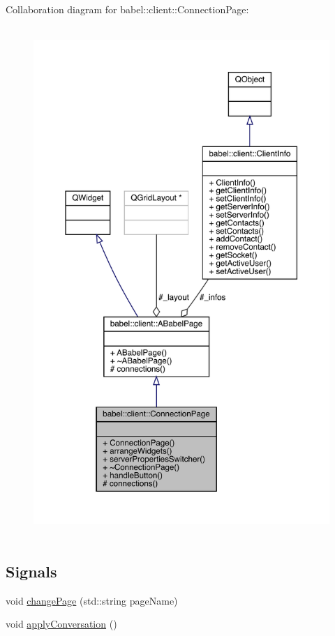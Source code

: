 Collaboration diagram for babel\+:\+:client\+:\+:Connection\+Page\+:\nopagebreak
\begin{figure}[H]
\begin{center}
\leavevmode
\includegraphics[height=550pt]{classbabel_1_1client_1_1_connection_page__coll__graph}
\end{center}
\end{figure}
\subsection*{Signals}
\begin{DoxyCompactItemize}
\item 
void \mbox{\hyperlink{classbabel_1_1client_1_1_connection_page_a7295b26d456525273cfbb29489a384d0}{change\+Page}} (std\+::string page\+Name)
\item 
void \mbox{\hyperlink{classbabel_1_1client_1_1_connection_page_ad70c7282778cc388376ba28c63e20f15}{apply\+Conversation}} ()
\end{DoxyCompactItemize}
